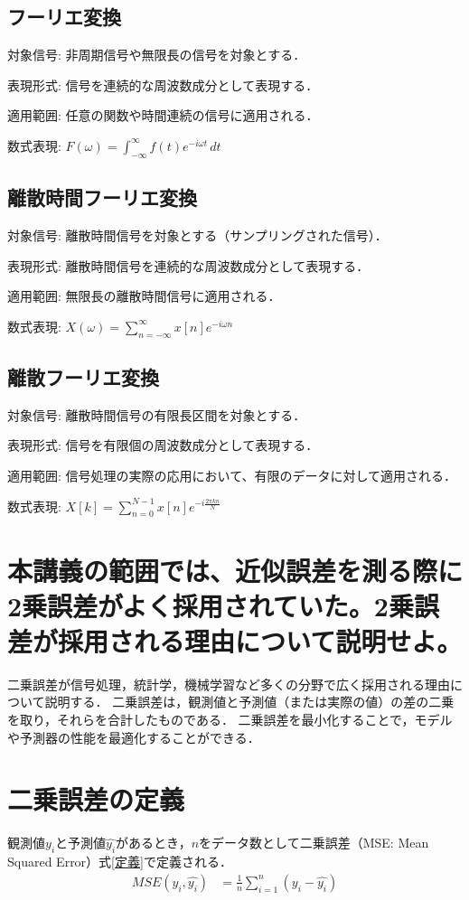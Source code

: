 \documentclass[titlepage,a4paper]{jsarticle}
\begin{document}
\subsection{フーリエ変換}
対象信号: 非周期信号や無限長の信号を対象とする．

表現形式: 信号を連続的な周波数成分として表現する．

適用範囲: 任意の関数や時間連続の信号に適用される．

数式表現: $F(\omega) = \int_{-\infty}^{\infty} f(t) e^{-i\omega t} \, dt$
\subsection{離散時間フーリエ変換}
対象信号: 離散時間信号を対象とする（サンプリングされた信号）．

表現形式: 離散時間信号を連続的な周波数成分として表現する．

適用範囲: 無限長の離散時間信号に適用される．

数式表現: $X(\omega) = \sum_{n=-\infty}^{\infty} x[n] e^{-i\omega n}$
\subsection{離散フーリエ変換}
対象信号: 離散時間信号の有限長区間を対象とする．

表現形式: 信号を有限個の周波数成分として表現する．

適用範囲: 信号処理の実際の応用において、有限のデータに対して適用される．

数式表現: $X[k] = \sum_{n=0}^{N-1} x[n] e^{-i \frac{2\pi k n}{N}}$
\section{本講義の範囲では、近似誤差を測る際に2乗誤差がよく採用されていた。2乗誤差が採用される理由について説明せよ。}
二乗誤差が信号処理，統計学，機械学習など多くの分野で広く採用される理由について説明する．
二乗誤差は，観測値と予測値（または実際の値）の差の二乗を取り，それらを合計したものである．
二乗誤差を最小化することで，モデルや予測器の性能を最適化することができる．
\section*{二乗誤差の定義}
観測値$y_i$と予測値$\hat{y_i}$があるとき，$n$をデータ数として二乗誤差（MSE: Mean Squared Error）式\eqref{定義}で定義される．
\begin{align}
  MSE(y_{i},\hat{y_{i}}) & = \frac{1}{n}\sum_{i=1}^{n}\left(y_{i}-\hat{y_{i}}\right)\label{定義}
\end{align}
\end{document}
